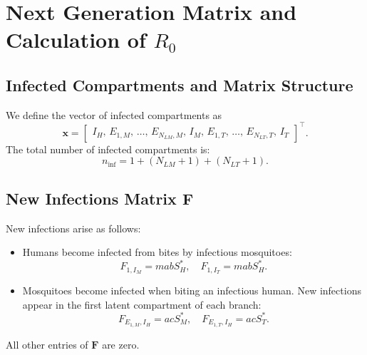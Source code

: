 \documentclass[12pt]{article}
\begin{document}
\section{Next Generation Matrix and Calculation of \(R_0\)}

\subsection{Infected Compartments and Matrix Structure}
We define the vector of infected compartments as
\[
\mathbf{x} = \begin{bmatrix}
I_H,\, E_{1,M},\, \dots,\, E_{N_{LM},M},\, I_M,\, E_{1,T},\, \dots,\, E_{N_{LT},T},\, I_T
\end{bmatrix}^\top.
\]
The total number of infected compartments is:
\[
n_{\text{inf}} = 1 + (N_{LM}+1) + (N_{LT}+1).
\]

\subsection{New Infections Matrix \(\mathbf{F}\)}
New infections arise as follows:
\begin{itemize}
    \item Humans become infected from bites by infectious mosquitoes:
    \[
    F_{1, I_M} = m a b S_H^*, \quad F_{1, I_T} = m a b S_H^*.
    \]
    \item Mosquitoes become infected when biting an infectious human. New infections appear in the first latent compartment of each branch:
    \[
    F_{E_{1,M}, I_H} = a c S_M^*, \quad F_{E_{1,T}, I_H} = a c S_T^*.
    \]
\end{itemize}
All other entries of \(\mathbf{F}\) are zero.
\end{document}
